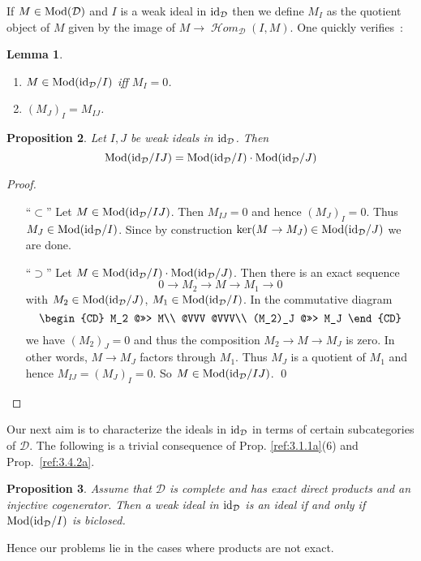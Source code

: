\documentclass{amsproc}
\def\Dscr{{\mathcal D}}
\def\Hscr{{\mathcal H}}
\def\HHom{\operatorname {\Hscr \mathit{om}}}
\def\Id{\text{id}}
\def\Mod{\mathop{\text{Mod}}}
\def\HHom{\operatorname {\Hscr \mathit{om}}}
\def\ker{\operatorname {ker}}
\def\r{\rightarrow}
\let\oldtext\text
\def\text#1{\oldtext{\upshape #1}}
\newtheorem{lemmas}{Lemma}[subsection]
\newtheorem{propositions}[lemmas]{Proposition}
\theoremstyle{definition}
\theoremstyle{remark}
\numberwithin{equation}{section}
\numberwithin{table}{section}
\numberwithin{figure}{section}
\begin{document}
If $M\in \Mod(\Dscr)$ and $I$ is a weak ideal in $\Id_\Dscr$ then we define
$M_I$ as the quotient object of $M$ given by the image of $M\r
\HHom_\Dscr(I,M)$. One quickly verifies~:
\begin{lemmas}
\begin{enumerate}
\item
$M\in \Mod(\Id_\Dscr/I)$ iff $M_I=0$.
\item $(M_J)_I=M_{IJ}$.
\end{enumerate}
\end{lemmas}
\begin{propositions} 
\label{ref:3.5.4a}
Let $I,J$ be weak ideals in $\Id_\Dscr$. Then
\[
\Mod(\Id_\Dscr/IJ)=\Mod(\Id_\Dscr/I)\cdot \Mod(\Id_\Dscr/J)
\]
\end{propositions}
\begin{proof}
\begin{itemize}
\item[``$\subset$''] Let $M\in \Mod(\Id_\Dscr/IJ)$. Then
$M_{IJ}=0$ and hence $(M_J)_I=0$. Thus $M_J\in \Mod(\Id_\Dscr/I)$. Since by
construction $\ker (M\r M_J)\in \Mod(\Id_\Dscr/J)$ we are done.
\item[``$\supset$''] Let $M\in \Mod(\Id_\Dscr/I)\cdot \Mod(\Id_\Dscr/J)$. Then
there is an exact sequence
\[
0\r M_2\r M\r M_1\r 0
\]
with $M_2\in \Mod(\Id_\Dscr/J)$, $M_1\in \Mod(\Id_\Dscr/I)$. In the commutative
diagram
\[
\begin{CD}
M_2 @>>> M\\
@VVV @VVV\\
(M_2)_J @>>> M_J
\end{CD}
\]
we have $(M_2)_J=0$ and thus the composition $M_2\r M \r M_J$ is zero. In other
words, $M\r M_J$ factors through $M_1$. Thus $M_J$ is a quotient of $M_1$ and
hence  $M_{IJ}=(M_J)_I=0$. So $M\in \Mod(\Id_\Dscr/IJ)$. \qed
\end{itemize}
\def\qed{}
\end{proof}

Our next aim is to characterize the ideals in  $\Id_\Dscr$ in terms of certain
subcategories of $\Dscr$. The following is a trivial consequence of
Prop. \ref{ref:3.1.1a}(6) and Prop.\ \ref{ref:3.4.2a}.
\begin{propositions}
\label{ref:3.5.5a}
 Assume that $\Dscr$ is complete and has exact direct
products and an injective cogenerator. Then a weak ideal in $\Id_\Dscr$ is an
ideal if and only if $\Mod(\Id_\Dscr/I)$ is biclosed.
\end{propositions}
Hence our problems lie in the cases where products are not exact.
\end{document}
